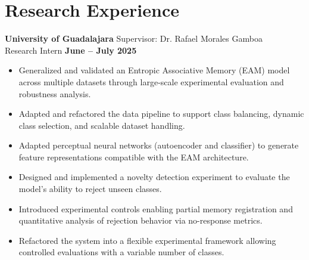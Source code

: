 \documentclass[11pt]{article}
\begin{document}
\section*{Research Experience}
\textbf{University of Guadalajara} \hfill Supervisor: Dr. Rafael Morales Gamboa \\
Research Intern \hfill \textbf{June -- July 2025}
\vspace{-0.3cm}
\begin{itemize}[leftmargin=*]
    \item Generalized and validated an Entropic Associative Memory (EAM) model across multiple datasets through large-scale experimental evaluation and robustness analysis.
    
    \vspace{-0.3cm}
    \item Adapted and refactored the data pipeline to support class balancing, dynamic class selection, and scalable dataset handling.
    
    \vspace{-0.3cm}
    \item Adapted perceptual neural networks (autoencoder and classifier) to generate feature representations compatible with the EAM architecture.
    
    \vspace{-0.3cm}
    \item Designed and implemented a novelty detection experiment to evaluate the model’s ability to reject unseen classes.
    
    \vspace{-0.3cm}
    \item Introduced experimental controls enabling partial memory registration and quantitative analysis of rejection behavior via no-response metrics.
    
    \vspace{-0.3cm}
    \item Refactored the system into a flexible experimental framework allowing controlled evaluations with a variable number of classes.
\end{itemize}




\end{document}
